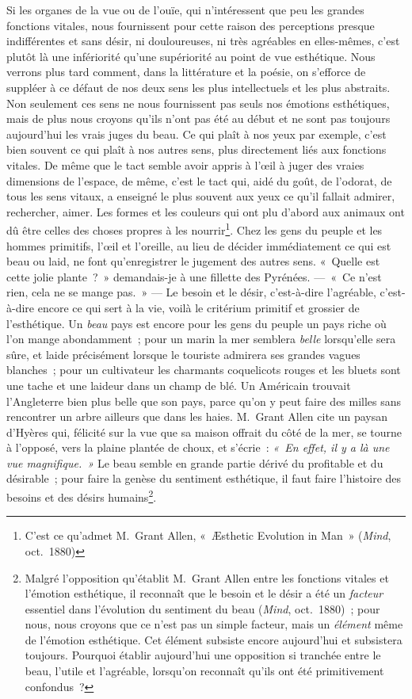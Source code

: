 \documentclass[french,twoside]{book} %
\begin{document}
Si les organes de la vue ou de l’ouïe, qui n’intéressent que peu les grandes fonctions vitales, nous fournissent pour cette raison des perceptions presque indifférentes et sans désir, ni douloureuses, ni très agréables en elles-mêmes, c’est plutôt là une infériorité qu’une supériorité au point de vue esthétique. Nous verrons plus tard comment, dans la littérature et la poésie, on s’efforce de suppléer à ce défaut de nos deux sens les plus intellectuels et les plus abstraits. Non seulement ces sens ne nous fournissent pas seuls nos émotions esthétiques, mais de plus nous croyons qu’ils n’ont pas été au début et ne sont pas toujours aujourd’hui les vrais juges du beau. Ce qui plaît à nos yeux par exemple, c’est bien souvent ce qui plaît à nos autres  sens, plus directement liés aux fonctions vitales. De même que le tact semble avoir appris à l’œil à juger des vraies dimensions de l’espace, de même, c’est le tact qui, aidé du goût, de l’odorat, de tous les sens vitaux, a enseigné le plus souvent aux yeux ce qu’il fallait admirer, rechercher, aimer. Les formes et les couleurs qui ont plu d’abord aux animaux ont dû être celles des choses propres à les nourrir\footnote{C’est ce qu’admet M. Grant Allen, « Æsthetic Evolution in Man » (\emph{Mind}, oct. 1880)}. Chez les gens du peuple et les hommes primitifs, l’œil et l’oreille, au lieu de décider immédiatement ce qui est beau ou laid, ne font qu’enregistrer le jugement des autres sens. « Quelle est cette jolie plante ? » demandais-je à une fillette des Pyrénées. — « Ce n’est rien, cela ne se mange pas. » — Le besoin et le désir, c’est-à-dire l’agréable, c’est-à-dire encore ce qui sert à la vie, voilà le critérium primitif et grossier de l’esthétique. Un \emph{beau} pays est encore pour les gens du peuple un pays riche où l’on mange abondamment ; pour un marin la mer semblera \emph{belle} lorsqu’elle sera sûre, et laide précisément lorsque le touriste admirera ses grandes vagues blanches ; pour un cultivateur les charmants coquelicots rouges et les bluets sont une tache et une laideur dans un champ de blé. Un Américain trouvait l’Angleterre bien plus belle que son pays, parce qu’on y peut faire des milles sans rencontrer un arbre ailleurs que dans les haies. M. Grant Allen cite un paysan d’Hyères qui, félicité sur la vue que sa maison offrait du côté de la mer, se tourne à l’opposé, vers la plaine plantée de choux, et s’écrie : \emph{« En effet, il y  a là une vue magnifique. »} Le beau semble en grande partie dérivé du profitable et du désirable ; pour faire la genèse du sentiment esthétique, il faut faire l’histoire des besoins et des désirs humains\footnote{Malgré l’opposition qu’établit M. Grant Allen entre les fonctions vitales et l’émotion esthétique, il reconnaît que le besoin et le désir a été un \emph{facteur} essentiel dans l’évolution du sentiment du beau (\emph{Mind}, oct. 1880) ; pour nous, nous croyons que ce n’est pas un simple facteur, mais un \emph{élément} même de l’émotion esthétique. Cet élément subsiste encore aujourd’hui et subsistera toujours. Pourquoi établir aujourd’hui une opposition si tranchée entre le beau, l’utile et l’agréable, lorsqu’on reconnaît qu’ils ont été primitivement confondus ?}.\par
\end{document}
